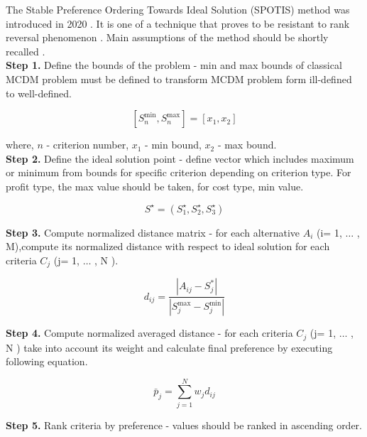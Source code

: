 
The Stable Preference Ordering Towards Ideal Solution (SPOTIS) method was introduced in 2020 \cite{dezert2020spotis}. It is one of a technique that proves to be resistant to rank reversal phenomenon \cite{shekhovtsov2021new}. Main assumptions of the method should be shortly recalled \cite{paradowski2021results}. \\

\noindent \textbf{Step 1.} Define the bounds of the problem - min and max bounds of classical MCDM problem must be defined to transform MCDM problem form ill-defined to well-defined.

\begin{equation}
\left[S_{n}^{\min }, S_{n}^{\max }\right]=\left[x_{1}, x_{2}\right]
\end{equation}

where, $n$ - criterion number, $x_1$ - min bound, $x_2$ - max bound. \\

\noindent \textbf{Step 2.} Define the ideal solution point - define vector which includes maximum or minimum from bounds for specific criterion depending on criterion type. For profit type, the max value should be taken, for cost type, min value.

\begin{equation}
S^{\star}=\left(S_{1}^{\star}, S_{2}^{\star}, S_{3}^{\star}\right)
\end{equation}

\noindent \textbf{Step 3.} Compute normalized distance matrix - for each alternative $A_{i}$ (i= 1, $\ldots$ , M),compute its normalized distance with respect to ideal solution for each criteria $C_{j}$ (j= 1, $\ldots$ , N ).

\begin{equation}
d_{i j}=\frac{\left|A_{i j}-S_{j}^{*}\right|}{\left|S_{j}^{\max }-S_{j}^{\min }\right|}
\end{equation}

\noindent \textbf{Step 4.} Compute normalized averaged distance - for each criteria $C_{j}$ (j= 1, $\ldots$ , N ) take into account its weight and calculate final preference by executing following equation.

\begin{equation}
\bar{p}_{j}=\sum_{j=1}^{N} w_{j} d_{i j}
\end{equation}

\noindent \textbf{Step 5.} Rank criteria by preference - values should be ranked in ascending order.

